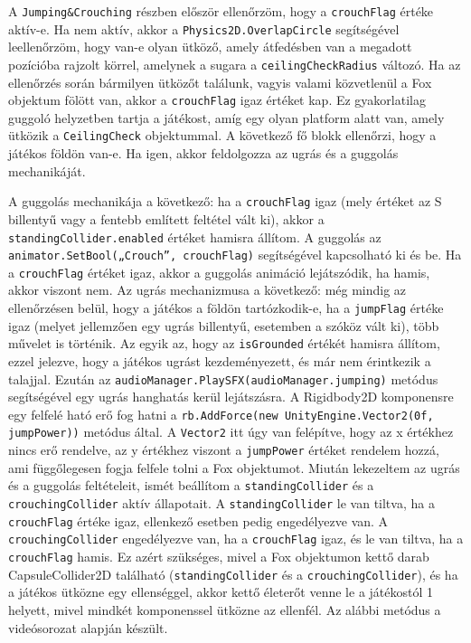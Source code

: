 A \texttt{Jumping\&Crouching} részben először ellenőrzöm, hogy a \texttt{crouchFlag} értéke aktív-e. Ha nem aktív, akkor a \texttt{Physics2D.OverlapCircle} segítségével leellenőrzöm, hogy van-e olyan ütköző, amely átfedésben van a megadott pozícióba rajzolt körrel, amelynek a sugara a \texttt{ceilingCheckRadius} változó. Ha az ellenőrzés során bármilyen ütközőt találunk, vagyis valami közvetlenül a Fox objektum fölött van, akkor a \texttt{crouchFlag} igaz értéket kap. Ez gyakorlatilag guggoló helyzetben tartja a játékost, amíg egy olyan platform alatt van, amely ütközik a \texttt{CeilingCheck} objektummal. A következő fő blokk ellenőrzi, hogy a játékos földön van-e. Ha igen, akkor feldolgozza az ugrás és a guggolás mechanikáját.

 A guggolás mechanikája a következő: ha a \texttt{crouchFlag} igaz (mely értéket az S billentyű vagy a fentebb említett feltétel vált ki), akkor a \texttt{standingCollider.enabled} értéket hamisra állítom. A guggolás az \texttt{animator.SetBool(„Crouch”, crouchFlag)} segítségével kapcsolható ki és be. Ha a \texttt{crouchFlag} értéket igaz, akkor a guggolás animáció lejátszódik, ha hamis, akkor viszont nem. Az ugrás mechanizmusa a következő: még mindig az ellenőrzésen belül, hogy a játékos a földön tartózkodik-e, ha a \texttt{jumpFlag} értéke igaz (melyet jellemzően egy ugrás billentyű, esetemben a szóköz vált ki), több művelet is történik. Az egyik az, hogy az \texttt{isGrounded} értékét hamisra állítom, ezzel jelezve, hogy a játékos ugrást kezdeményezett, és már nem érintkezik a talajjal. Ezután az \texttt{audioManager.PlaySFX(audioManager.jumping)} metódus segítségével egy ugrás hanghatás kerül lejátszásra. A Rigidbody2D komponensre egy felfelé ható erő fog hatni a \texttt{rb.AddForce(new UnityEngine.Vector2(0f, jumpPower))} metódus által. A \texttt{Vector2} itt úgy van felépítve, hogy az x értékhez nincs erő rendelve, az y értékhez viszont a \texttt{jumpPower} értéket rendelem hozzá, ami függőlegesen fogja felfele tolni a Fox objektumot. Miután lekezeltem az ugrás és a guggolás feltételeit, ismét beállítom a \texttt{standingCollider} és a \texttt{crouchingCollider} aktív állapotait. A \texttt{standingCollider} le van tiltva, ha a \texttt{crouchFlag} értéke igaz, ellenkező esetben pedig engedélyezve van. A \texttt{crouchingCollider} engedélyezve van, ha a \texttt{crouchFlag} igaz, és le van tiltva, ha a \texttt{crouchFlag} hamis. Ez azért szükséges, mivel a Fox objektumon kettő darab CapsuleCollider2D található (\texttt{standingCollider} és a \texttt{crouchingCollider}), és ha a játékos ütközne egy ellenséggel, akkor kettő életerőt venne le a játékostól 1 helyett, mivel mindkét komponenssel ütközne az ellenfél. Az alábbi metódus a \cite{youtubeplaylist} videósorozat alapján készült.

